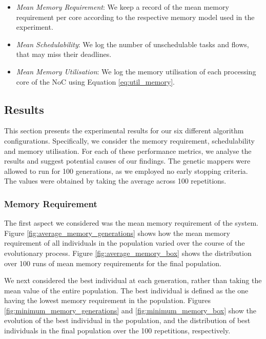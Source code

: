 \documentclass[conference]{IEEEtran}
\begin{document}
\begin{itemize}
	\item\emph{Mean Memory Requirement}: We keep a record of the mean memory requirement per core according to the respective memory model used in the experiment. 
	\item\emph{Mean Schedulability}: We log the number of unschedulable tasks and flows, that may miss their deadlines.
	\item\emph{Mean Memory Utilisation}: We log the memory utilisation of each processing core of the NoC using Equation \ref{eq:util_memory}. 
\end{itemize}

\subsection{Results}\label{results}

This section presents the experimental results for our six different algorithm configurations. Specifically, we consider the memory requirement, schedulability and memory utilisation. For each of these performance metrics, we analyse the results and suggest potential causes of our findings. The genetic mappers were allowed to run for 100 generations, as we employed no early stopping criteria. The values were obtained by taking the average across 100 repetitions.

\subsubsection{Memory Requirement}\label{memory_requirement}

The first aspect we considered was the mean memory requirement of the system. Figure \ref{fig:average_memory_generations} shows how the mean memory requirement of all individuals in the population varied over the course of the evolutionary process. Figure \ref{fig:average_memory_box} shows the distribution over 100 runs of mean memory requirements for the final population.

We next considered the best individual at each generation, rather than taking the mean value of the entire population. The best individual is defined as the one having the lowest memory requirement in the population. Figures \ref{fig:minimum_memory_generations} and \ref{fig:minimum_memory_box} show the evolution of the best individual in the population, and the distribution of best individuals in the final population over the 100 repetitions, respectively. 
\end{document}
